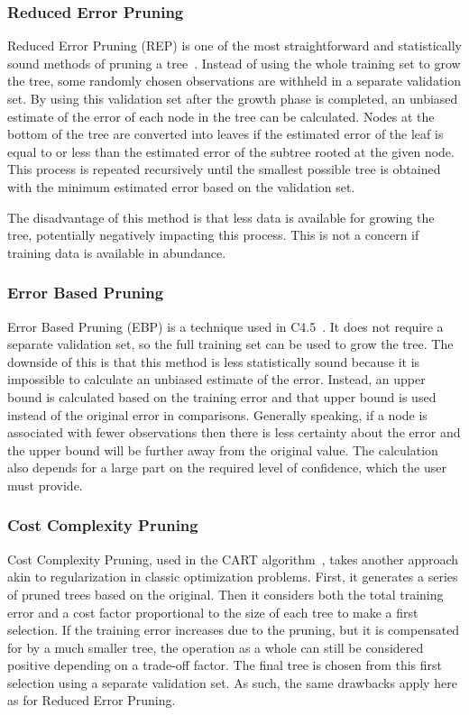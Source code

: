 \subsubsection{Reduced Error Pruning}
Reduced Error Pruning (REP) is one of the most straightforward and statistically sound methods of pruning a tree~\cite{quinlan1987simplifying, repanalysis}. Instead of using the whole training set to grow the tree, some randomly chosen observations are withheld in a separate validation set. By using this validation set after the growth phase is completed, an unbiased estimate of the error of each node in the tree can be calculated. Nodes at the bottom of the tree are converted into leaves if the estimated error of the leaf is equal to or less than the estimated error of the subtree rooted at the given node. This process is repeated recursively until the smallest possible tree is obtained with the minimum estimated error based on the validation set.

The disadvantage of this method is that less data is available for growing the tree, potentially negatively impacting this process. This is not a concern if training data is available in abundance.

\subsubsection{Error Based Pruning}
Error Based Pruning (EBP) is a technique used in C4.5~\cite{c45}. It does not require a separate validation set, so the full training set can be used to grow the tree. The downside of this is that this method is less statistically sound because it is impossible to calculate an unbiased estimate of the error. Instead, an upper bound is calculated based on the training error and that upper bound is used instead of the original error in comparisons. Generally speaking, if a node is associated with fewer observations then there is less certainty about the error and the upper bound will be further away from the original value. The calculation also depends for a large part on the required level of confidence, which the user must provide.

\subsubsection{Cost Complexity Pruning}
Cost Complexity Pruning, used in the CART algorithm~\cite{cart}, takes another approach akin to regularization in classic optimization problems. First, it generates a series of pruned trees based on the original. Then it considers both the total training error and a cost factor proportional to the size of each tree to make a first selection. If the training error increases due to the pruning, but it is compensated for by a much smaller tree, the operation as a whole can still be considered positive depending on a trade-off factor. The final tree is chosen from this first selection using a separate validation set. As such, the same drawbacks apply here as for Reduced Error Pruning.

